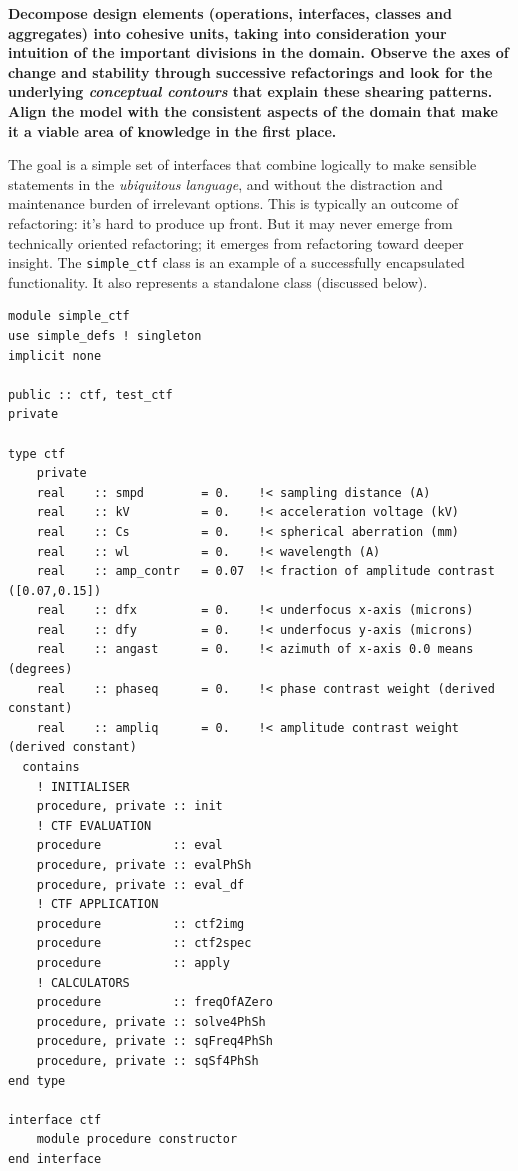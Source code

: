 \documentclass[a4paper,11pt]{article}
\begin{document}
\textbf{Decompose design elements (operations, interfaces, classes and aggregates) into cohesive units, taking into consideration your intuition of the important divisions in the domain. Observe the axes of change and stability through successive refactorings and look for the underlying \textit{conceptual contours} that explain these shearing patterns. Align the model with the consistent aspects of the domain that make it a viable area of knowledge in the first place.}

The goal is a simple set of interfaces that combine logically to make sensible statements in the \textit{ubiquitous language}, and without the distraction and maintenance burden of irrelevant options. This is typically an outcome of refactoring: it's hard to produce up front. But it may never emerge from technically oriented refactoring; it emerges from refactoring toward deeper insight. The \texttt{simple\_ctf} class is an example of a successfully encapsulated functionality. It also represents a standalone class (discussed below).

\begin{verbatim}
module simple_ctf
use simple_defs ! singleton
implicit none

public :: ctf, test_ctf
private

type ctf
    private
    real    :: smpd        = 0.    !< sampling distance (A)
    real    :: kV          = 0.    !< acceleration voltage (kV) 
    real    :: Cs          = 0.    !< spherical aberration (mm)
    real    :: wl          = 0.    !< wavelength (A)
    real    :: amp_contr   = 0.07  !< fraction of amplitude contrast ([0.07,0.15])
    real    :: dfx         = 0.    !< underfocus x-axis (microns)
    real    :: dfy         = 0.    !< underfocus y-axis (microns)
    real    :: angast      = 0.    !< azimuth of x-axis 0.0 means (degrees)
    real    :: phaseq      = 0.    !< phase contrast weight (derived constant)
    real    :: ampliq      = 0.    !< amplitude contrast weight (derived constant)
  contains
    ! INITIALISER
    procedure, private :: init
    ! CTF EVALUATION
    procedure          :: eval
    procedure, private :: evalPhSh
    procedure, private :: eval_df
    ! CTF APPLICATION
    procedure          :: ctf2img
    procedure          :: ctf2spec
    procedure          :: apply
    ! CALCULATORS
    procedure          :: freqOfAZero
    procedure, private :: solve4PhSh
    procedure, private :: sqFreq4PhSh
    procedure, private :: sqSf4PhSh
end type

interface ctf
    module procedure constructor
end interface
\end{verbatim}
\end{document}
